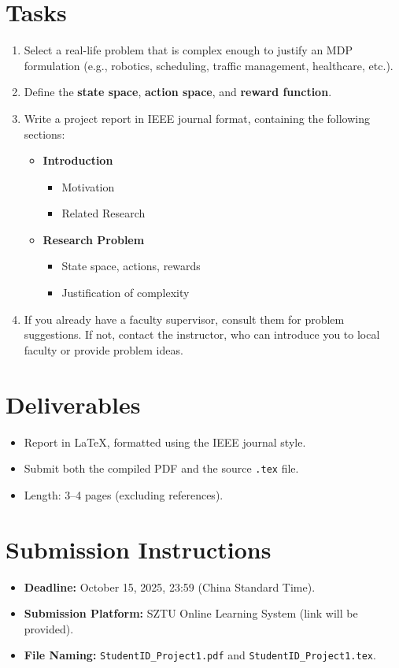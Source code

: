 \documentclass[12pt]{article}
\begin{document}
\section{Tasks}
\begin{enumerate}[leftmargin=*]
    \item Select a real-life problem that is complex enough to justify an MDP formulation (e.g., robotics, scheduling, traffic management, healthcare, etc.).
    \item Define the \textbf{state space}, \textbf{action space}, and \textbf{reward function}. 
    \item Write a project report in IEEE journal format, containing the following sections:
    \begin{itemize}
        \item \textbf{Introduction} 
        \begin{itemize}
            \item Motivation
            \item Related Research
        \end{itemize}
        \item \textbf{Research Problem}
        \begin{itemize}
            \item State space, actions, rewards
            \item Justification of complexity
        \end{itemize}
    \end{itemize}
    \item If you already have a faculty supervisor, consult them for problem suggestions. If not, contact the instructor, who can introduce you to local faculty or provide problem ideas.
\end{enumerate}

\section{Deliverables}
\begin{itemize}[leftmargin=*]
    \item Report in \LaTeX, formatted using the IEEE journal style.
    \item Submit both the compiled PDF and the source \texttt{.tex} file.
    \item Length: 3–4 pages (excluding references).
\end{itemize}

\section{Submission Instructions}
\begin{itemize}[leftmargin=*]
    \item \textbf{Deadline:} October 15, 2025, 23:59 (China Standard Time).
    \item \textbf{Submission Platform:} SZTU Online Learning System (link will be provided).
    \item \textbf{File Naming:} \texttt{StudentID\_Project1.pdf} and \texttt{StudentID\_Project1.tex}.
\end{itemize}
\end{document}
